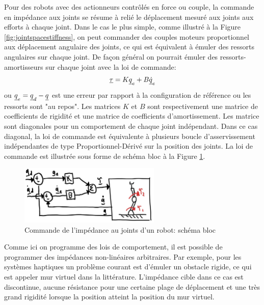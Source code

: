 Pour des robots avec des actionneurs contrôlés en force ou couple, la commande en impédance aux joints se résume à relié le déplacement mesuré aux joints aux efforts à chaque joint. Dans le cas le plus simple, comme illustré à la Figure \ref{fig:jointspacestiffness}, on peut commander des couples moteurs proportionnel aux déplacement angulaire des joints, ce qui est équivalent à émuler des ressorts angulaires sur chaque joint. De façon général on pourrait émuler des ressorts-amortisseurs sur chaque joint avec la loi de commande:
\begin{align}
\underline{\tau} = K \underline{q}_e + B \underline{\dot{q}}_e
\label{eq:jointspaceimpe}
\end{align}
ou $\underline{q}_e = \underline{q}_d - \underline{q}$ est une erreur par rapport à la configuration de référence ou les ressorts sont "au repos". Les matrices $K$ et $B$ sont respectivement une matrice de coefficients de rigidité et une matrice de coefficients d'amortissement. Les matrice sont diagonales pour un comportement de chaque joint indépendant. Dans ce cas diagonal, la loi de commande est équivalente à plusieurs boucle d'asservissement indépendantes de type Proportionnel-Dérivé sur la position des joints. La loi de commande est illustrée sous forme de schéma bloc à la Figure \ref{fig:impedancecontroljoint}.
\begin{figure}[h]
	\centering
		\includegraphics[width=0.6\textwidth]{fig/impedancecontroljoint.jpg}
	\caption{Commande de l'impédance au joints d'un robot: schéma bloc}
	\label{fig:impedancecontroljoint}
\end{figure}
Comme ici on programme des lois de comportement, il est possible de programmer des impédances non-linéaires arbitraires. Par exemple, pour les systèmes haptiques un problème courant est d'émuler un obstacle rigide, ce qui est appeler mur virtuel dans la littérature. L'impédance cible dans ce cas est discontinue, aucune résistance pour une certaine plage de déplacement et une très grand rigidité lorsque la position atteint la position du mur virtuel.

